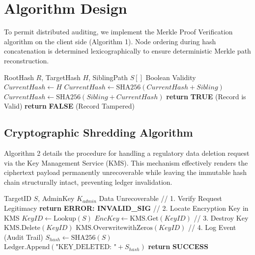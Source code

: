 \documentclass[conference]{IEEEtran}
\renewcommand{\RETURN}{\STATE \textbf{return} }
\begin{document}
\section{Algorithm Design}
To permit distributed auditing, we implement the Merkle Proof Verification algorithm on the client side (Algorithm 1). Node ordering during hash concatenation is determined lexicographically to ensure deterministic Merkle path reconstruction.

\begin{algorithm}[H]
\caption{Merkle Proof Verification (Client Side)}
\begin{algorithmic}[1]
\REQUIRE RootHash $R$, TargetHash $H$, SiblingPath $S[]$
\ENSURE Boolean Validity
\STATE $CurrentHash \leftarrow H$
        \STATE $CurrentHash \leftarrow \text{SHA256}(CurrentHash + Sibling)$
    \ELSE
        \STATE $CurrentHash \leftarrow \text{SHA256}(Sibling + CurrentHash)$
    \ENDIF
\ENDFOR
{}
    \RETURN \textbf{TRUE} (Record is Valid)
\ELSE
    \RETURN \textbf{FALSE} (Record Tampered)
\ENDIF
\end{algorithmic}
\end{algorithm}

\subsection{Cryptographic Shredding Algorithm}
Algorithm 2 details the procedure for handling a regulatory data deletion request via the Key Management Service (KMS). This mechanism effectively renders the ciphertext payload permanently unrecoverable while leaving the immutable hash chain structurally intact, preventing ledger invalidation. 

\begin{algorithm}[H]
\caption{Cryptographic Shredding Request}
\begin{algorithmic}[1]
\REQUIRE TargetID $S$, AdminKey $K_{admin}$
\ENSURE Data Unrecoverable
\STATE // 1. Verify Request Legitimacy
    \RETURN \textbf{ERROR: INVALID\_SIG}
\ENDIF
\STATE // 2. Locate Encryption Key in KMS
\STATE $KeyID \leftarrow \text{Lookup}(S)$
\STATE $EncKey \leftarrow \text{KMS.Get}(KeyID)$
\STATE // 3. Destroy Key
\STATE $\text{KMS.Delete}(KeyID)$
\STATE $\text{KMS.OverwritewithZeros}(KeyID)$
\STATE // 4. Log Event (Audit Trail)
\STATE $S_{hash} \leftarrow \text{SHA256}(S)$
\STATE $\text{Ledger.Append}(\text{"KEY\_DELETED: "} + S_{hash})$
\RETURN \textbf{SUCCESS}
\end{algorithmic}
\end{algorithm}
\end{document}
